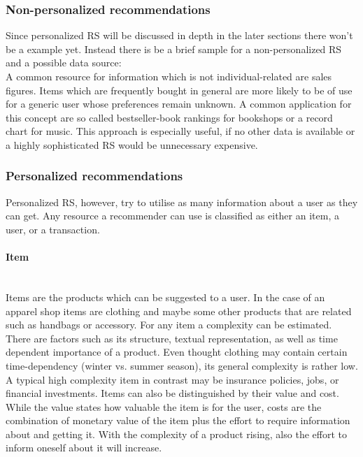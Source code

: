 \subsubsection{Non-personalized recommendations}
Since personalized RS will be discussed in depth in the later sections there won't be a example yet.
Instead there is be a brief sample for a non-personalized RS and a possible data source:
\\
A common resource for information which is not individual-related are sales figures.
Items which are frequently bought in general are more likely to be of use for a generic user whose preferences remain unknown.
\citep[p.~10-11]{ricci:2011}
A common application for this concept are so called bestseller-book rankings for bookshops or a record chart for music.
This approach is especially useful, if no other data is available or a highly sophisticated RS would be unnecessary expensive.

\subsubsection{Personalized recommendations}
Personalized RS, however, try to utilise as many information about a user as they can get.
Any resource a recommender can use is classified as either an item, a user, or a transaction.

\paragraph{Item}\hfill\\
Items are the products which can be suggested to a user.
In the case of an apparel shop items are clothing and maybe some other products that are related such as handbags or accessory.
For any item a complexity can be estimated.
There are factors such as its structure, textual representation, as well as time dependent importance of a product.
Even thought clothing may contain certain time-dependency (winter vs. summer season), its general complexity is rather low.
A typical high complexity item in contrast may be insurance policies, jobs, or financial investments.
Items can also be distinguished by their value and cost.
While the value states how valuable the item is for the user, costs are the combination of monetary value of the item plus the effort to require information about and getting it.
With the complexity of a product rising, also the effort to inform oneself about it will increase.
\citep[p.~8]{ricci:2011}

